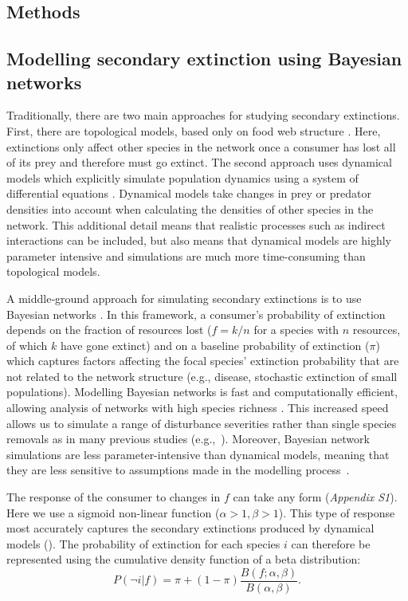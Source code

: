\documentclass[12pt]{article}
\begin{document}
\begin{spacing}{2.0}
\section*{Methods}

    \subsection*{Modelling secondary extinction using Bayesian networks}

        Traditionally, there are two main approaches for studying secondary extinctions. First, there are topological models, based only on food web structure \citep{dunne2009cascading}. Here, extinctions only affect other species in the network once a consumer has lost all of its prey and therefore must go extinct. 
        The second approach uses dynamical models which explicitly simulate population dynamics using a system of differential equations \citep{binzer2011susceptibility}. Dynamical models take changes in prey or predator densities into account when calculating the densities of other species in the network. 
        This additional detail means that realistic processes such as indirect interactions can be included, but also means that dynamical models are highly parameter intensive and simulations are much more time-consuming than topological models. 
        
        
        A middle‐ground approach for simulating secondary extinctions is to use Bayesian networks \citep{Eklof2013,Haussler2020}. 
        In this framework, a consumer's probability of extinction depends on the fraction of resources lost ($f = k/n$ for a species with $n$ resources, of which $k$ have gone extinct) and on a baseline probability of extinction ($\pi$) which captures factors affecting the focal species' extinction probability that are not related to the network structure (e.g., disease, stochastic extinction of small populations).
        Modelling Bayesian networks is fast and computationally efficient, allowing analysis of networks with high species richness \citep{Haussler2020}. 
        This increased speed allows us to simulate a range of disturbance severities rather than single species removals as in many previous studies (e.g.,~\citealp[]{Memmott2004,Staniczenko2010,Dunne2004}).
        Moreover, Bayesian network simulations are less parameter-intensive than dynamical models, meaning that they are less sensitive to assumptions made in the modelling process~\citep{Eklof2013}.
    
        
        The response of the consumer to changes in $f$ can take any form (\emph{Appendix S1}). Here we use a sigmoid non-linear function ($\alpha > 1, \beta > 1$).
		This type of response most accurately captures the secondary extinctions produced by dynamical models (\citealp[]{Eklof2013}).
		The probability of extinction for each species $i$ can therefore be represented using the cumulative density function of a beta distribution:
		\begin{equation}
		P(\lnot i|f) = \pi + (1 - \pi) \frac{B(f;\alpha,\beta)}{B(\alpha,\beta)}.
				\label{betafunc}
        \end{equation}
		

\end{spacing}
\end{document}
